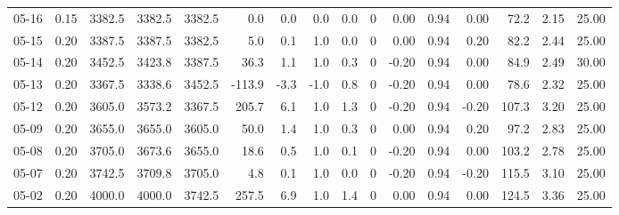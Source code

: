 \begin{threeparttable}
{\begin{tabular}{lrrrrrrrrrrrrrrr}
  05-16 &     0.15 & 3382.5 & 3382.5 & 3382.5 &        0.0 &            0.0 &                      0.0 &                 0.0 &              0 &       0.00 &      0.94 &           0.00 &             72.2 &            2.15 &                  25.00 \\
  05-15 &     0.20 & 3387.5 & 3387.5 & 3382.5 &        5.0 &            0.1 &                      1.0 &                 0.0 &              0 &       0.00 &      0.94 &           0.20 &             82.2 &            2.44 &                  25.00 \\
  05-14 &     0.20 & 3452.5 & 3423.8 & 3387.5 &       36.3 &            1.1 &                      1.0 &                 0.3 &              0 &      -0.20 &      0.94 &           0.00 &             84.9 &            2.49 &                  30.00 \\
  05-13 &     0.20 & 3367.5 & 3338.6 & 3452.5 &     -113.9 &           -3.3 &                     -1.0 &                 0.8 &              0 &      -0.20 &      0.94 &           0.00 &             78.6 &            2.32 &                  25.00 \\
  05-12 &     0.20 & 3605.0 & 3573.2 & 3367.5 &      205.7 &            6.1 &                      1.0 &                 1.3 &              0 &      -0.20 &      0.94 &          -0.20 &            107.3 &            3.20 &                  25.00 \\
  05-09 &     0.20 & 3655.0 & 3655.0 & 3605.0 &       50.0 &            1.4 &                      1.0 &                 0.3 &              0 &       0.00 &      0.94 &           0.20 &             97.2 &            2.83 &                  25.00 \\
  05-08 &     0.20 & 3705.0 & 3673.6 & 3655.0 &       18.6 &            0.5 &                      1.0 &                 0.1 &              0 &      -0.20 &      0.94 &           0.00 &            103.2 &            2.78 &                  25.00 \\
  05-07 &     0.20 & 3742.5 & 3709.8 & 3705.0 &        4.8 &            0.1 &                      1.0 &                 0.0 &              0 &      -0.20 &      0.94 &          -0.20 &            115.5 &            3.10 &                  25.00 \\
  05-02 &     0.20 & 4000.0 & 4000.0 & 3742.5 &      257.5 &            6.9 &                      1.0 &                 1.4 &              0 &       0.00 &      0.94 &           0.00 &            124.5 &            3.36 &                  25.00 \\

\end{tabular}}
\end{threeparttable}

